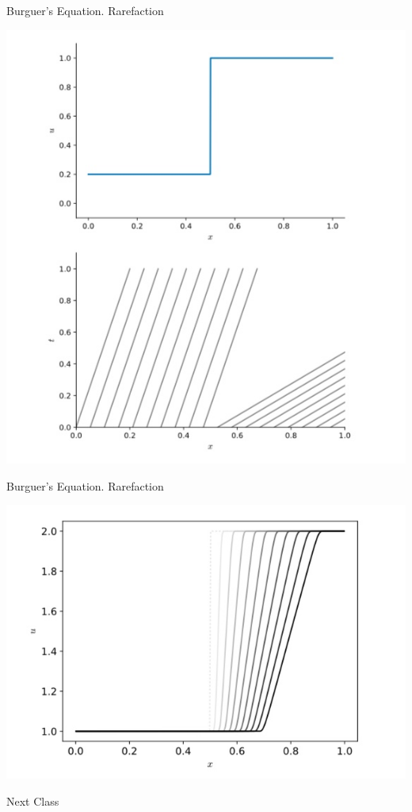 \documentclass[11pt]{beamer}
\begin{document}
\begin{frame}[fragile]{Burguer's Equation. Rarefaction}
\begin{center}
\includegraphics[scale=0.3]{burguerscharact2}
\end{center}
\end{frame}

\begin{frame}[fragile]{Burguer's Equation. Rarefaction}
\begin{center}
\includegraphics[scale=0.3]{burguersrarefaction}
\end{center}
\end{frame}



\begin{frame}[fragile]{Next Class}
\end{frame}
\end{document}
